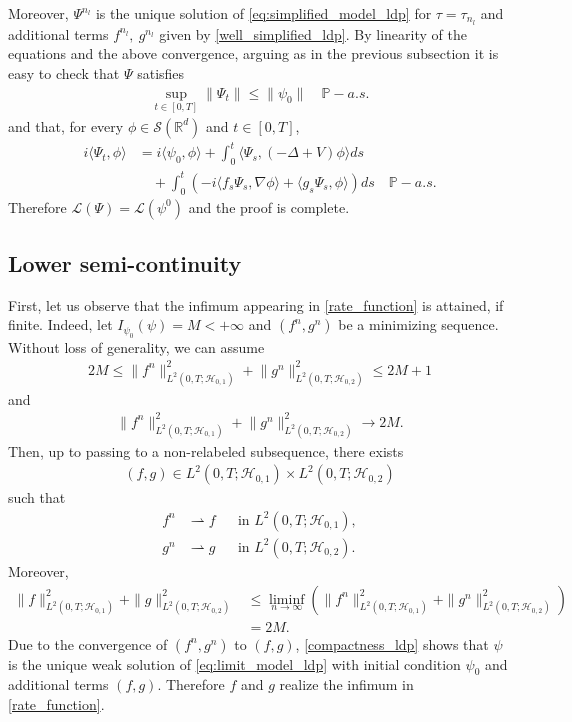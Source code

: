 \documentclass[a4paper,10pt]{amsart}
\newcommand{\R}{\mathbb{R}}
\theoremstyle{remark}
\numberwithin{equation}{section}
\begin{document}
 Moreover, $\Psi^{n_l}$ is the unique solution of \eqref{eq:simplified_model_ldp} for $\tau=\tau_{n_l}$ and additional terms $f^{n_l},\ g^{n_l}$ given by \cref{well_simplified_ldp}. By linearity of the equations and the above convergence, arguing as in the previous subsection it is easy to check that $\Psi$ satisfies
 \begin{align*}
     \sup_{t\in [0,T]}\|\Psi_t\|\leq \|\psi_0\|\quad \mathbb{P}-a.s.
 \end{align*}
   and that, for every $\phi\in\mathscr{S}(\R^d)$ and $t\in[0,T]$,
   \begin{align*}
      i\langle \Psi_t,\phi\rangle&=i\langle \psi_0,\phi\rangle+\int_0^t \langle\Psi_s, (-\Delta+V)\phi\rangle ds\\
      &\quad+\int_0^t\left(-i\langle f_s\Psi_s,\nabla \phi\rangle+\langle g_s\Psi_s,\phi\rangle\right)ds\quad \mathbb{P}-a.s.
   \end{align*}
   Therefore $\mathcal{L}(\Psi)=\mathcal{L}(\psi^0)$ and the proof is complete.
\subsection{Lower semi-continuity}
First, let us observe that the infimum appearing in \eqref{rate_function} is attained, if finite. 
    Indeed, let $I_{\psi_0}(\psi)=M<+\infty$ and $(f^n,g^n)$ be a minimizing sequence. 
    Without loss of generality, we can assume
    \begin{align*}
        2M\leq\lVert f^n \rVert_{L^2(0,T;\mathcal{H}_{0,1})}^2
        +\lVert g^n \rVert_{L^2(0,T;\mathcal{H}_{0,2})}^2
        \leq 2M+1
    \end{align*}
	    and 
	    \begin{align*}
	        \lVert f^n \rVert_{L^2(0,T;\mathcal{H}_{0,1})}^2
	        +\lVert g^n \rVert_{L^2(0,T;\mathcal{H}_{0,2})}^2
	        \rightarrow 2M.
	    \end{align*}
	    Then, up to passing to a non-relabeled subsequence, there exists
	    \begin{align*}
	    (f,g)\in L^2(0,T;\mathcal{H}_{0,1})
	    \times L^2(0,T;\mathcal{H}_{0,2})
	    \end{align*}
	    such that
	    \begin{align*}
	       f^n&\rightharpoonup f
	       &&\text{in }L^2(0,T;\mathcal{H}_{0,1}),\\
	       g^n&\rightharpoonup g
	       &&\text{in }L^2(0,T;\mathcal{H}_{0,2}).
	    \end{align*}
	    Moreover,
	    \begin{align*}
	       \|f\|_{L^2(0,T;\mathcal H_{0,1})}^2
	       +\|g\|_{L^2(0,T;\mathcal H_{0,2})}^2
	       &\leq\liminf_{n\to\infty}
	       \left(
	       \|f^n\|_{L^2(0,T;\mathcal H_{0,1})}^2
	       +\|g^n\|_{L^2(0,T;\mathcal H_{0,2})}^2
	       \right)\\
	       &=2M.
    \end{align*}
    Due to the convergence of $(f^n,g^n)$ to $(f,g)$,
    \cref{compactness_ldp} shows that $\psi$ is the unique weak solution of
    \eqref{eq:limit_model_ldp} with initial condition $\psi_0$ and
    additional terms $(f,g)$.
	    Therefore $f$ and $g$ realize the infimum in \eqref{rate_function}.
    
\end{document}
